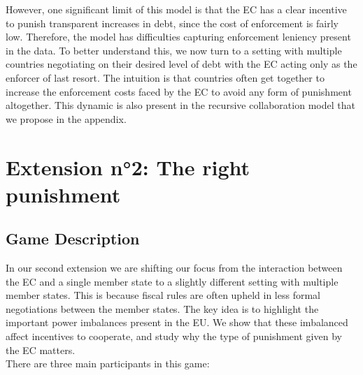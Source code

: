 \documentclass{article}
\begin{document}
However, one significant limit of this model is that the EC has a clear incentive to punish transparent increases in debt, since the cost of enforcement is fairly low. Therefore, the model has difficulties capturing enforcement leniency present in the data. To better understand this, we now turn to a setting with multiple countries negotiating on their desired level of debt with the EC acting only as the enforcer of last resort. The intuition is that countries often get together to increase the enforcement costs faced by the EC to avoid any form of punishment altogether. This dynamic is also present in the recursive collaboration model that we propose in the appendix.



\section{Extension n°2: The right punishment }

\subsection{Game Description}

In our second extension we are shifting our focus from the interaction between the EC and a single member state to a slightly different setting with multiple member states. This is because fiscal rules are often upheld in less formal negotiations between the member states. The key idea is to highlight the important power imbalances present in the EU. We show that these imbalanced affect incentives to cooperate, and study why the type of punishment given by the EC matters. \\

There are three main participants in this game:
\end{document}
